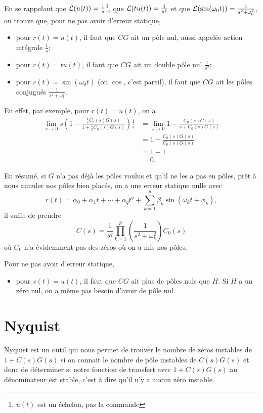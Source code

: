 En se rappelant que $\mathcal{L}(u(t)) = \frac{1}{s}$\footnote{$u(t)$ est un échelon, pas la commande},
que $\mathcal{L}(tu(t)) = \frac{1}{s^2}$
et que $\mathcal{L}(\sin(\omega_0 t)) = \frac{1}{s^2+\omega_0^2}$, on trouve que,
pour ne pas avoir d'erreur statique,
\begin{itemize}
  \item pour $r(t) = u(t)$, il faut que $CG$ ait un pôle nul,
    aussi appelée action intégrale $\frac{1}{s}$;
  \item pour $r(t) = t u(t)$, il faut que $CG$ ait un double pôle nul $\frac{1}{s^2}$;
  \item pour $r(t) = \sin(\omega_0 t)$ (ou $\cos$, c'est pareil), il faut que $CG$ ait les pôles conjugués $\frac{1}{s^2+\omega_k^2}$.
\end{itemize}
En effet, par exemple, pour $r(t) = u(t)$, on a
\begin{align*}
  \lim_{s \to 0} s\left(1 - \frac{\frac{1}{s}C_0(s)G(s)}{1+\frac{1}{s}C_0(s)G(s)}\right)\frac{1}{s}
  & = \lim_{s \to 0} 1 - \frac{C_0(s)G(s)}{s+C_0(s)G(s)}\\
  & = 1 - \frac{C_0(s)G(s)}{C_0(s)G(s)}\\
  & = 1 - 1\\
  & = 0.
\end{align*}

En résumé, si $G$ n'a pas déjà les pôles voulus et qu'il ne les a pas en pôles, prêt à nous annuler
nos pôles bien placés, on a une erreur statique nulle avec
\[ r(t) = \alpha_0 + \alpha_1 t + \cdots + \alpha_q t^q + \sum_{k=1}^p \beta_k \sin(\omega_k t + \phi_k), \]
il suffit de prendre
\[ C(s) = \frac{1}{s^q} \prod_{k=1}^p \left(\frac{1}{s^2+\omega_k^2}\right) C_0(s) \]
où $C_0$ n'a évidemment pas des zéros où on a mis nos pôles.

Pour ne pas avoir d'erreur statique,
\begin{itemize}
  \item pour $v(t) = u(t)$, il faut que $CG$ ait plus de pôles nuls que $H$.
    Si $H$ a un zéro nul, on a même pas besoin d'avoir de pôle nul.
\end{itemize}

\section{Nyquist}
Nyquist est un outil qui nous permet de trouver le nombre de zéros instables de
$1 + C(s)G(s)$ si on connait le nombre de pôle instables de $C(s)G(s)$ et
donc de déterminer si notre fonction de transfert avec $1+C(s)G(s)$ au dénominateur
est stable, c'est à dire qu'il n'y a aucun zéro instable.

